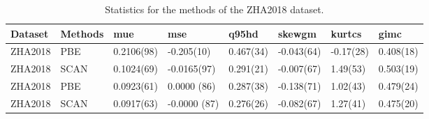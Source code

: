\begin{table}[ht]
\centering
\begin{tabular}{llllllll}
  \hline
Dataset & Methods & mue & mse & q95hd & skewgm & kurtcs & gimc \\ 
  \hline
ZHA2018 & PBE & 0.2106(98) & -0.205(10) & 0.467(34) & -0.043(64) & -0.17(28) & 0.408(18) \\ 
  ZHA2018 & SCAN & 0.1024(69) & -0.0165(97) & 0.291(21) & -0.007(67) & 1.49(53) & 0.503(19) \\ 
  ZHA2018 & PBE & 0.0923(61) & 0.0000        (86) & 0.287(38) & -0.138(71) & 1.02(43) & 0.479(24) \\ 
  ZHA2018 & SCAN & 0.0917(63) & -0.0000      (87) & 0.276(26) & -0.082(67) & 1.27(41) & 0.475(20) \\ 
   \hline
\end{tabular}
\caption{Statistics for the methods of the ZHA2018 dataset.} 
\label{tab:statsZHA}
\end{table}
